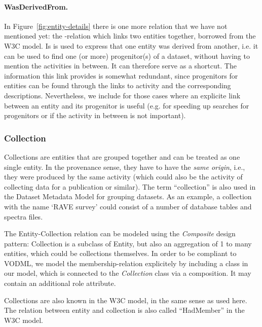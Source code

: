 \paragraph{WasDerivedFrom.}
In Figure~\ref{fig:entity-details} there is one more relation that we have not mentioned yet: 
the -relation which links two entities together, borrowed from the W3C model. 
Is is used to express that 
one entity was derived from another, i.e. it can be used to find one (or more) progenitor(s) 
of a dataset, without having to mention the activities in between. It can therefore serve as 
a shortcut. The information this link provides is somewhat redundant, since progenitors for entities
can be found through the links to activity and the corresponding descriptions.
Nevertheless, we include  for those cases where an explicite 
link between an entity and its progenitor is useful (e.g. for speeding up searches for 
progenitors or if the activity in between is not important).



\subsubsection{Collection}\label{sec:collection}
Collections are entities that are grouped together and can be treated as one single entity. 
In the provenance sense, they have to have the \emph{same origin}, i.e., they were 
produced by the same activity (which could also be the activity of collecting
data for a publication or similar). The term ``collection'' is 
also used in the Dataset Metadata Model for grouping datasets.
As an example, a collection 
with the name `RAVE survey' could consist of a number of database tables and spectra files.


The Entity-Collection relation can be modeled using the \emph{Composite} design pattern: 
Collection is a subclass of Entity, but also an aggregation of 1 to many entities, 
which could be collections themselves. 
In order to be compliant to VODML, we model the membership-relation explicitely 
by including a  class in our model, which is connected to the
\emph{Collection} class via a composition. It may contain an additional role attribute.

Collections are also known in the W3C model, in the same sense as used here.
The relation between entity and collection is also called ``HadMember'' in the W3C model.

